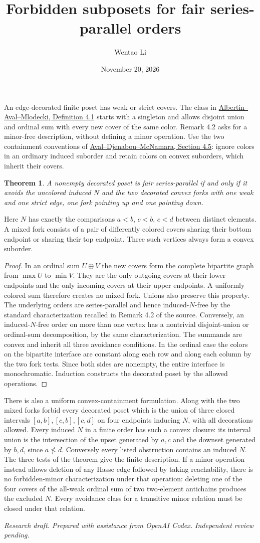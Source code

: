 \documentclass[11pt]{article}
\title{Forbidden subposets for fair series-parallel orders}
\author{Wentao Li}
\date{November 20, 2026}
\newtheorem{theorem}{Theorem}
\begin{document}
\maketitle

An edge-decorated finite poset has weak or strict covers. The class in \href{https://ajc.maths.uq.edu.au/pdf/90/ajc_v90_p341.pdf}{Albertin--Aval--Mlodecki, Definition 4.1} starts with a singleton and allows disjoint union and ordinal sum with every new cover of the same color. Remark 4.2 asks for a minor-free description, without defining a minor operation. Use the two containment conventions of \href{https://doi.org/10.5802/alco.273}{Aval--Djenabou--McNamara, Section 4.5}: ignore colors in an ordinary induced suborder and retain colors on convex suborders, which inherit their covers.
\begin{theorem}A nonempty decorated poset is fair series-parallel if and only if it avoids the uncolored induced $N$ and the two decorated convex forks with one weak and one strict edge, one fork pointing up and one pointing down.\end{theorem}
Here $N$ has exactly the comparisons $a<b$, $c<b$, $c<d$ between distinct elements. A mixed fork consists of a pair of differently colored covers sharing their bottom endpoint or sharing their top endpoint. Three such vertices always form a convex suborder.
\begin{proof}In an ordinal sum $U\oplus V$ the new covers form the complete bipartite graph from $\max U$ to $\min V$. They are the only outgoing covers at their lower endpoints and the only incoming covers at their upper endpoints. A uniformly colored sum therefore creates no mixed fork. Unions also preserve this property. The underlying orders are series-parallel and hence induced-$N$-free by the standard characterization recalled in Remark 4.2 of the source.
Conversely, an induced-$N$-free order on more than one vertex has a nontrivial disjoint-union or ordinal-sum decomposition, by the same characterization. The summands are convex and inherit all three avoidance conditions. In the ordinal case the colors on the bipartite interface are constant along each row and along each column by the two fork tests. Since both sides are nonempty, the entire interface is monochromatic. Induction constructs the decorated poset by the allowed operations.\end{proof}
There is also a uniform convex-containment formulation. Along with the two mixed forks forbid every decorated poset which is the union of three closed intervals $[a,b],[c,b],[c,d]$ on four endpoints inducing $N$, with all decorations allowed. Every induced $N$ in a finite order has such a convex closure: its interval union is the intersection of the upset generated by $a,c$ and the downset generated by $b,d$, since $a\nleq d$. Conversely every listed obstruction contains an induced $N$. The three tests of the theorem give the finite description. If a minor operation instead allows deletion of any Hasse edge followed by taking reachability, there is no forbidden-minor characterization under that operation: deleting one of the four covers of the all-weak ordinal sum of two two-element antichains produces the excluded $N$. Every avoidance class for a transitive minor relation must be closed under that relation.

\medskip\noindent\textit{Research draft. Prepared with assistance from OpenAI Codex. Independent review pending.}
\end{document}
